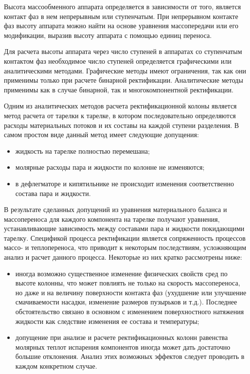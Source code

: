 Высота массообменного аппарата определяется в зависимости от того, является контакт фаз в нем непрерывным или ступенчатым. При непрерывном контакте фаз высоту аппарата можно найти на основе уравнения массопередачи или его модификации, выразив высоту аппарата с помощью единиц переноса.

Для расчета высоты аппарата через число ступеней в аппаратах со ступенчатым контактом фаз необходимое число ступеней определяется графическими или аналитическими методами. Графические методы имеют ограничения, так как они применимы только при расчете бинарной ректификации. Аналитические методы применимы как в случае бинарной, так и многокомпонентной ректификации.

Одним из аналитических методов расчета ректификационной колоны является метод расчета от тарелки к тарелке, в котором последовательно определяются расходы материальных потоков и их составы на каждой ступени разделения. В самом простом виде данный метод имеет следующие допущения:
\begin{itemize}
	\item жидкость на тарелке полностью перемешана;
	\item молярные расходы пара и жидкости по колонне не изменяются;
	\item в дефлегматоре и кипятильнике не происходит изменения соответственно состава пара и жидкости.
\end{itemize}

В результате сделанных допущений из уравнения материального баланса и массопереноса для каждого компонента на тарелке получают уравнения, устанавливающие зависимость между составами пара и жидкости покидающими тарелку. 
Спецификой процесса ректификации является сопряженность процессов массо- и теплопереноса, что приводит к некоторым последствиям, усложняющим анализ и расчет данного процесса. Некоторые из них кратко рассмотрены ниже:
\begin{itemize}
	\item иногда возможно существенное изменение физических свойств сред по высоте колонны, что может повлиять не только на скорость массопереноса, но даже и на величину поверхности контакта фаз (ухудшение или улучшение смачиваемости насадки, изменение размеров пузырьков и т.д.). Последнее обстоятельство связано в основном с изменением поверхностного натяжения жидкости как следствие изменения ее состава и температуры;
	\item допущение при анализе и расчете ректификационных колонн равенства молярных теплот испарения компонентов иногда может дать достаточно большие отклонения. Анализ этих возможных эффектов следует проводить в каждом конкретном случае.
\end{itemize}

